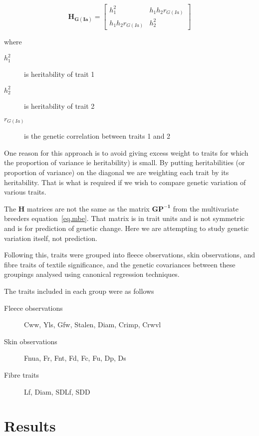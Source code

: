 \documentclass[titlepage]{article}  %
\begin{document}
\begin{displaymath}
\bm{H_{G(Ia)}} = 
 \left[ \begin{array}{cc}
 h^{2}_{1} & h_{1}h_{2}r_{G(Ia)} \\
 h_{1}h_{2}r_{G(Ia)} & h^{2}_{2}
\end{array} \right]
\end{displaymath}

 where 
\begin{description}
\item[$h^{2}_{1}$] is heritability of trait 1
\item[$h^{2}_{2}$] is heritability of trait 2
\item[$r_{G(Ia)}$] is the genetic correlation between traits 1 and 2
\end{description}

One reason for this approach is to avoid giving excess weight to traits for which the proportion of variance ie heritability) is small. By putting heritabilities (or proportion of variance) on the diagonal we are weighting each trait by its heritability. That is what is required if we wish to compare genetic variation of various traits.

The $\bm{H}$ matrices are not the same as the matrix $\bm{GP^{-1}}$ from the multivariate breeders equation~\ref{eq.mbe}. That matrix is in trait units and is not symmetric and is for prediction of genetic change. Here we are attempting to study genetic variation itself, not prediction.

 Following this, traits were grouped into fleece observations, skin observations, and fibre traits of textile significance, and the genetic covariances between these groupings analysed using canonical regression techniques.

The traits included in each group were as follows
\begin{description}
\item[Fleece observations] Cww, Yls, Gfw, Stalen, Diam, Crimp, Crwvl
\item[Skin observations] Fnua, Fr, Fnt, Fd, Fc, Fu, Dp, Ds
\item[Fibre traits] Lf, Diam, SDLf, SDD
\end{description}



\section{Results}
\end{document}

